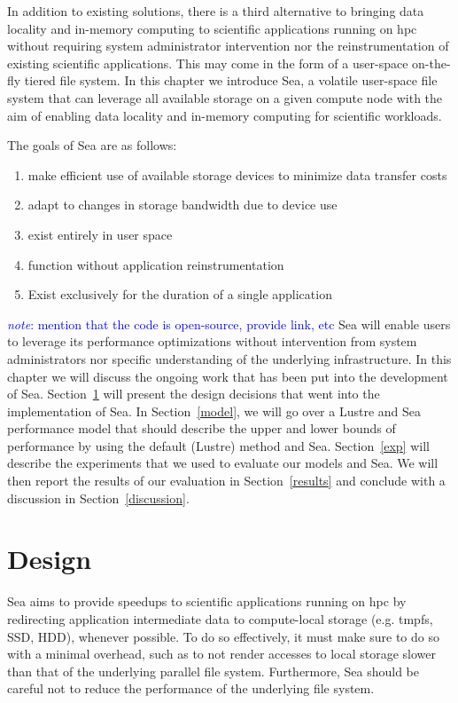 \documentclass{report}
\newcommand{\note}[1]{\textcolor{blue}{\textit{note}: #1}}
\begin{document}
    In addition to existing solutions, there is a third alternative to bringing data
    locality and in-memory computing to scientific applications running on \gls{hpc}
    without requiring system administrator intervention nor the reinstrumentation
    of existing scientific applications. This may come in the form of a user-space 
    on-the-fly tiered file system. In this chapter we introduce Sea, a volatile user-space file
    system that can leverage all available storage on a given compute node with the aim
    of enabling data locality and in-memory computing for scientific workloads.

    The goals of Sea are as follows:
    \begin{enumerate}
            \item make efficient use of available storage devices to minimize data
                transfer costs
            \item adapt to changes in storage bandwidth due to device use
            \item exist entirely in user space
            \item function without application reinstrumentation
            \item Exist exclusively for the duration of a single application
    \end{enumerate}

    \note{mention that the code is open-source, provide link, etc}
   Sea will enable users to leverage its performance optimizations without intervention
   from system administrators nor specific understanding of the underlying infrastructure.
   In this chapter we will discuss the ongoing work that has been put into the development
   of Sea. Section~\ref{design} will present the design decisions that went into the
   implementation of Sea. In Section~\ref{model}, we will go over a Lustre and Sea
   performance model that should describe the upper and lower bounds of performance by using
   the default (Lustre) method and Sea. Section~\ref{exp} will describe the experiments that we
   used to evaluate our models and Sea. We will then report the results of our evaluation
   in Section~\ref{results} and conclude with a discussion in Section~\ref{discussion}.
    
   \section{Design}\label{design}
   Sea aims to provide speedups to scientific applications running on \gls{hpc}
   by redirecting application intermediate data to compute-local storage (e.g. tmpfs,
   SSD, HDD), whenever possible.
   To do so effectively, it must make sure to do so with a minimal overhead, such as
   to not render accesses to local storage slower than that of the underlying parallel
   file system. Furthermore, Sea should be careful not to reduce the performance of the
   underlying file system.
\end{document}
